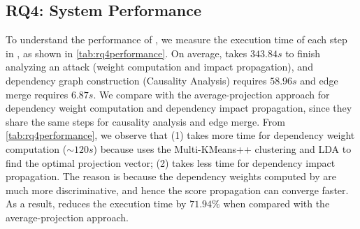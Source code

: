 %



\subsection{RQ4: System Performance}

To understand the performance of \tool, we measure the execution time of each step in \tool, as shown in \cref{tab:rq4performance}.
On average, \tool takes $343.84s$ to finish
analyzing an attack (\ie weight computation and impact propagation), and dependency graph construction (\ie Causality Analysis) requires $58.96s$ and edge merge requires $6.87s$.
%
We compare \tool with the average-projection approach for dependency weight computation and dependency impact propagation, since they share the same steps for causality analysis and edge merge. 
From \cref{tab:rq4performance}, we observe that 
(1) \tool takes more time for dependency weight computation ($\sim120s$) because \tool uses the Multi-KMeans++ clustering and LDA to find the optimal projection vector;
(2) \tool takes less time for dependency impact propagation. The reason is because the dependency weights computed by \tool are much more discriminative, and hence the score propagation can converge faster.
As a result, \tool reduces the execution time by $71.94\%$ when compared with the average-projection approach. 

